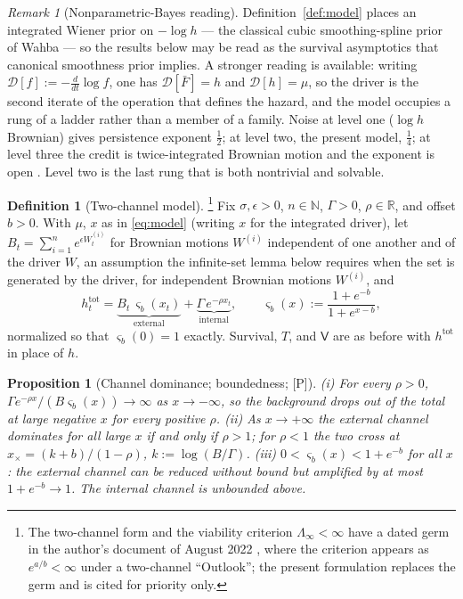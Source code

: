 \documentclass[11pt]{article}
\newtheorem{proposition}[theorem]{Proposition}
\theoremstyle{definition}
\newtheorem{definition}[theorem]{Definition}
\theoremstyle{remark}
\newtheorem{remark}[theorem]{Remark}
\newcommand{\R}{\mathbb{R}}
\newcommand{\Imm}{\mathsf{V}}
\begin{document}
\begin{remark}[Nonparametric-Bayes reading]
Definition~\ref{def:model} places an integrated Wiener prior on
$-\log h$ --- the classical cubic smoothing-spline prior of Wahba
\cite{Wah78} --- so the results below may be read as the survival
asymptotics that canonical smoothness prior implies. A stronger
reading is available: writing $\mathcal D[f]:=-\frac{d}{dt}\log f$,
one has $\mathcal D[\bar F]=h$ and $\mathcal D[h]=\mu$, so the driver
is the second iterate of the operation that defines the hazard, and
the model occupies a rung of a ladder rather than a member of a
family. Noise at level one ($\log h$ Brownian) gives persistence
exponent $\tfrac12$; at level two, the present model, $\tfrac14$; at
level three the credit is twice-integrated Brownian motion and the
exponent is open \cite{AS15,AD13}. Level two is the last rung that is
both nontrivial and solvable.
\end{remark}

\begin{definition}[Two-channel model]\label{def:twochannel}\footnote{The
two-channel form and the viability criterion $\Lambda_\infty<\infty$
have a dated germ in the author's document of August 2022
\cite{BenGolden22}, where the criterion appears as $e^{a/b}<\infty$
under a two-channel ``Outlook''; the present formulation replaces the
germ and is cited for priority only.}
Fix $\sigma,\epsilon>0$, $n\in\mathbb N$, $\Gamma>0$, $\rho\in\R$, and
offset $b>0$. With $\mu$, $x$ as in \eqref{eq:model} (writing $x$ for
the integrated driver), let
$B_t=\sum_{i=1}^n e^{\epsilon W^{(i)}_t}$ for Brownian motions
$W^{(i)}$ independent of one another and of the driver $W$, an
assumption the infinite-set lemma below requires when the set is
generated by the driver, for independent Brownian
motions $W^{(i)}$, and
\begin{equation}\label{eq:hazard}
h^{\mathrm{tot}}_t
=\underbrace{B_t\,\varsigma_b(x_t)}_{\text{external}}
+\underbrace{\Gamma\,e^{-\rho x_t}}_{\text{internal}},
\qquad
\varsigma_b(x):=\frac{1+e^{-b}}{1+e^{x-b}},
\end{equation}
normalized so that $\varsigma_b(0)=1$ exactly. Survival, $T$, and
$\Imm$ are as before with $h^{\mathrm{tot}}$ in place of $h$.
\end{definition}

\begin{proposition}[Channel dominance; boundedness; {[P]}]
\label{prop:dominance}
(i) For every $\rho>0$,
$\Gamma e^{-\rho x}/(B\varsigma_b(x))\to\infty$ as $x\to-\infty$, so
the background drops out of the total at large negative $x$ for every
positive $\rho$. (ii) As $x\to+\infty$ the external channel dominates
for all large $x$ if and only if $\rho>1$; for $\rho<1$ the two cross
at $x_\times=(k+b)/(1-\rho)$, $k:=\log(B/\Gamma)$. (iii)
$0<\varsigma_b(x)<1+e^{-b}$ for all $x$: the external channel can be
reduced without bound but amplified by at most $1+e^{-b}\to1$. The
internal channel is unbounded above.
\end{proposition}
\end{document}
